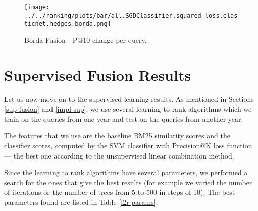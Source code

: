 \begin{figure}
\centerline{
  \texttt{[image: ../../ranking/plots/bar/all.SGDClassifier.squared\_loss.elasticnet.hedges.borda.png]}
  }
  \caption{Borda Fusion - P@10 change per query.}
  \label{borda-query}
\end{figure}


\section{Supervised Fusion Results}
Let us now move on to the supervised learning results. As mentioned in Sections \ref{sup-fusion} and \ref{impl-sup}, we use several
learning to rank algorithms which we train on the queries from one year and test on the queries from another year.

The features that we use are the baseline BM25 similarity scores and the classifier scores, computed by the SVM 
classifier with Precision@K loss function --- the best one according to the unsupervised linear combination method.

Since the learning to rank algorithms have several parameters, we performed a search for the ones that give the best
results (for example we varied the number of iterations or the number of trees from 5 to 500 in steps of 10).
The best parameters found are listed in Table \ref{l2r-params}.

\begin{table}[h!]
\centering
\caption{Learning to Rank Parameters}
\label{l2r-params}
\end{table}

